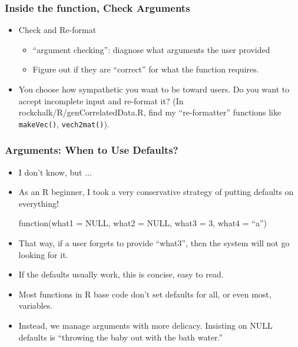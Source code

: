 \documentclass[11pt,english]{beamer}
\begin{document}
\begin{frame}[containsverbatim]
  \frametitle{Inside the function, Check Arguments}

  \begin{itemize}
  \item Check and Re-format

    \begin{itemize}
    \item ``argument checking'': diagnose what arguments the
      user provided
    \item Figure out if they are ``correct'' for what the function
      requires.
    \end{itemize}
  \item You choose how sympathetic you want to be toward users. Do you
    want to accept incomplete input and re-format it? (In
    rockchalk/R/genCorrelatedData.R, find my ``re-formatter''
    functions like \texttt{makeVec()},  \texttt{vech2mat()}).

  \end{itemize}
\end{frame}


\begin{frame}[containsverbatim]
  \frametitle{Arguments: When to Use Defaults?}

  \begin{itemize}
    \item I don't know, but $\ldots$
  \item As an R beginner, I took a very conservative strategy of
    putting defaults on everything!

\begin{Sinput}
function(what1 = NULL, what2 = NULL, what3 = 3, what4 = ``a'')
\end{Sinput}

  \item That way, if a user forgets to provide
    ``what3'', then the system will not go looking for it.
  \item If the defaults usually work, this is concise, easy to read.

  \item Most functions in R base code don't set defaults for all, or
    even most, variables.

  \item Instead, we manage arguments with more delicacy.  Insisting on
    NULL defaults is ``throwing the baby out with the bath water.''
 \end{itemize}
\end{frame}
\end{document}
